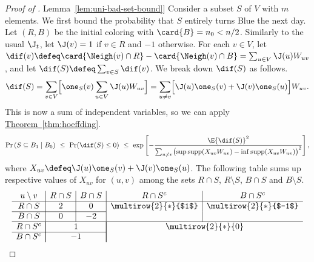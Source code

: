 \documentclass[11pt]{article}
\numberwithin{equation}{section}
\theoremstyle{definition}
\theoremstyle{plain}
\newcommand{\expref}[2]{\hyperref[#2]{#1~\ref{#2}}}
\begin{document}
			\begin{proof}[Proof of \expref{Lemma}{lem:uni-bad-set-bound}]
				Consider a subset $S$ of $V$ with $m$ elements.
				We first bound the probability that $S$ entirely turns Blue the next day.
				Let $(R, B)$ be the initial coloring with $\card{B} = n_0 < n/2$.
				Similarly to the usual $\J_t$, let $\J(v) = 1$ if $v\in R$ and $-1$ otherwise.
				For each $v\in V$, let
				$\dif(v) \defeq \card{\Neigh(v) \cap R} - \card{\Neigh(v) \cap B} = \sum_{u\in V} \J(u)W_{uv}$,
				and let $\dif(S) \defeq \sum_{v\in S}\dif(v)$.
				We break down $\dif(S)$ as follows.
				\begin{equation} \label{eq:difS}
					\begin{aligned}
						\dif(S) = \sum_{v\in V} \Bigl[\one_S(v)\sum_{u\in V}\J(u)W_{uv}\Bigr]
						= \sum_{u \neq v} \Bigl[\J(u)\one_S(v) + \J(v)\one_S(u) \Bigr] W_{uv}.
					\end{aligned}
				\end{equation}
				This is now a sum of independent variables, so we can apply \expref{Theorem}{thm:hoeffding}.
				\begin{equation}  \label{eq:uni-bad-set-bound-temp1}
					\begin{aligned}
						\Pr\left(S\subseteq B_1\mid B_0\right)
						\ \le \ \Pr(\dif(S)\le 0)
						\ \le \ \exp\left[
						- \frac{\E{\dif(S)}^2}
						{\sum_{u\neq v} \bigl(\sup \text{supp}(X_{uv}W_{uv})
							- \inf \text{supp}(X_{uv}W_{uv})\bigr)^2}
						\right],
					\end{aligned}
				\end{equation}
				where $X_{uv} \defeq \J(u)\one_S(v) + \J(v)\one_S(u)$.
				The following table sums up respective values of $X_{uv}$ for $(u, v)$ among the sets
				$R\cap S$, $R\setminus S$, $B\cap S$ and $B\setminus S$.
				\begin{equation}  \label{eq:X_(uv)-table}
					\begin{array}{c|c|c|c|c}
						u\setminus v & R\cap S               & B\cap S               & R\cap S^c & B\cap S^c \\ \hline
						R\cap S      & 2 & 0 & \multirow{2}{*}{$1$} & \multirow{2}{*}{$-1$} \\ \cline{1-3}
						B\cap S      & 0 & -2 &           &  \\ \hline
						R\cap S^c    & \multicolumn{2}{|c|}{1}               & \multicolumn{2}{|c}{\multirow{2}{*}{0}}  \\ \cline{1-3}
						B\cap S^c    & \multicolumn{2}{|c|}{-1}              & \multicolumn{2}{|c}{}
					\end{array}
				\end{equation}
				

\end{proof}
\end{document}
